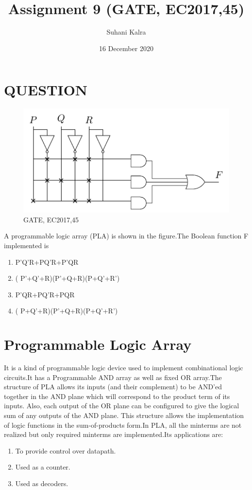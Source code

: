 \documentclass{report}
\title{Assignment 9 (GATE, EC2017,45)}
\author{Suhani Kalra }
\date{16 December 2020}
\begin{document}
\maketitle
\section{QUESTION}
\begin{figure}[htp]
        \centering
        \includegraphics[width=17cm]{image.pdf}
        \caption{GATE, EC2017,45}
        \label{fig:ok}
\end{figure}
\huge
A programmable logic array (PLA) is shown in the figure.The Boolean function F implemented is

 \begin{enumerate}
 \item P'Q'R+PQ'R+P'QR
\item ( P'+Q'+R)(P'+Q+R)(P+Q'+R')
\item P'QR+PQ'R+PQR
\item ( P+Q'+R)(P'+Q+R)(P+Q'+R')
  \end{enumerate}





\newpage
\section{Programmable Logic Array}
 It is a kind of programmable logic device used to implement combinational logic circuits.It has a Programmable AND array as well as fixed OR array.The structure of PLA allows its inputs (and their complement) to be AND’ed together in the AND plane which will correspond to the product term of its inputs. Also, each output of the OR plane can be configured to give the logical sum of any outputs of the AND plane. This structure allows the implementation of logic functions in the sum-of-products form.In PLA, all the minterms are not realized but only required minterms are implemented.Its applications are:
 \begin{enumerate}
 \item To provide control over datapath.

\item Used as a counter.

\item Used as decoders.
\end{enumerate}
\end{document}
